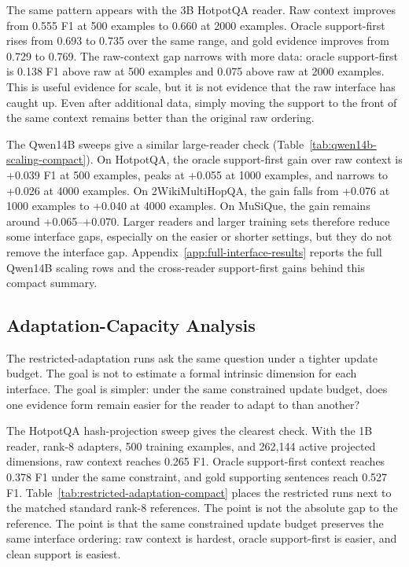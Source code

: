 \documentclass[a4paper,fleqn]{cas-sc}
\begin{document}
The same pattern appears with the 3B HotpotQA reader. Raw context improves
from 0.555 F1 at 500 examples to 0.660 at 2000 examples. Oracle support-first rises
from 0.693 to 0.735 over the same range, and gold evidence improves from 0.729
to 0.769. The raw-context gap narrows with more data: oracle support-first is 0.138
F1 above raw at 500 examples and 0.075 above raw at 2000 examples. This is
useful evidence for scale, but it is not evidence that the raw interface has
caught up. Even after additional data, simply moving the support to the front
of the same context remains better than the original raw ordering.

The Qwen14B sweeps give a similar large-reader check
(Table~\ref{tab:qwen14b-scaling-compact}). On HotpotQA, the oracle
support-first gain over raw context is +0.039 F1 at 500 examples, peaks at
+0.055 at 1000 examples, and narrows to +0.026 at 4000 examples. On
2WikiMultiHopQA, the gain falls from +0.076 at 1000 examples to +0.040 at 4000
examples. On MuSiQue, the gain remains around +0.065--+0.070. Larger readers
and larger training sets therefore reduce some interface gaps, especially on
the easier or shorter settings, but they do not remove the interface gap.
Appendix~\ref{app:full-interface-results} reports the full Qwen14B scaling
rows and the cross-reader support-first gains behind this compact summary.

\subsection{Adaptation-Capacity Analysis}

The restricted-adaptation runs ask the same question under a tighter update
budget. The goal is not to estimate a formal intrinsic dimension for each
interface. The goal is simpler: under the same constrained update budget, does
one evidence form remain easier for the reader to adapt to than another?

The HotpotQA hash-projection sweep gives the clearest check. With the 1B
reader, rank-8 adapters, 500 training examples, and 262,144 active projected
dimensions, raw context reaches 0.265 F1. Oracle support-first context reaches 0.378
F1 under the same constraint, and gold supporting sentences reach 0.527 F1.
Table~\ref{tab:restricted-adaptation-compact} places the restricted runs next
to the matched standard rank-8 references. The point is not the absolute gap to
the reference. The point is that the same constrained update budget preserves
the same interface ordering: raw context is hardest, oracle support-first is easier,
and clean support is easiest.
\end{document}
